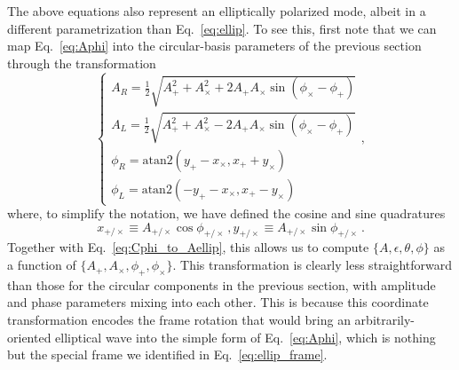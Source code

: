 \documentclass[aps,prd,twocolumn,superscriptaddress,preprintnumbers,floatfix,nofootinbib]{revtex4-2}
\begin{document}
\newcommand{\xp}{x_{+}}
\newcommand{\xc}{x_{\times}}
\newcommand{\xpc}{x_{+/\times}}
\newcommand{\yp}{y_{+}}
\newcommand{\yc}{y_{\times}}
\newcommand{\ypc}{y_{+/\times}}


The above equations also represent an elliptically polarized mode, albeit in a different parametrization than Eq.~\eqref{eq:ellip}.
To see this, first note that we can map Eq.~\eqref{eq:Aphi} into the circular-basis parameters of the previous section through the transformation
\begin{equation} \label{eq:Aphi_to_Cphi}
\begin{cases}
A_R = \frac{1}{2}\sqrt{A_+^2 + A_\times^2 + 2 A_+ A_\times \sin(\phi_\times - \phi_+)} \\
A_L = \frac{1}{2}\sqrt{A_+^2 + A_\times^2 - 2 A_+ A_\times \sin(\phi_\times - \phi_+)} \\
\phi_R = \mathrm{atan2}\left(\yp -\xc, \xp + \yc \right) \\
\phi_L = \mathrm{atan2}\left(-\yp -\xc, \xp - \yc \right)\, 
\end{cases} ,
\end{equation}
where, to simplify the notation, we have defined the cosine and sine quadratures
\begin{subequations} \label{eq:xy}
\begin{equation}
\xpc \equiv A_{+/\times} \cos \phi_{+/\times} \, ,
\end{equation}
\begin{equation}
\ypc \equiv A_{+/\times} \sin \phi_{+/\times} \, .
\end{equation}
\end{subequations}
Together with Eq.~\eqref{eq:Cphi_to_Aellip}, this allows us to compute $\{A, \epsilon, \theta, \phi\}$ as a function of $\{A_+, A_\times, \phi_+, \phi_\times\}$.
This transformation is clearly less straightforward than those for the circular components in the previous section, with amplitude and phase parameters mixing into each other.
This is because this coordinate transformation encodes the frame rotation that would bring an arbitrarily-oriented elliptical wave into the simple form of Eq.~\eqref{eq:Aphi}, which is nothing but the special frame we identified in Eq.~\eqref{eq:ellip_frame}.
\end{document}
